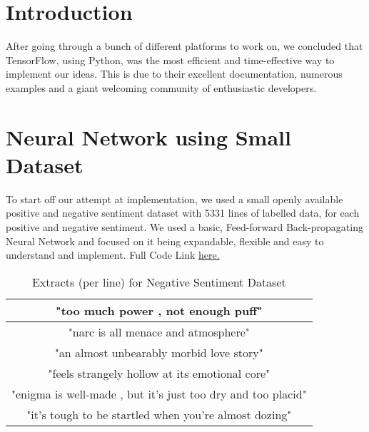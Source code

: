 
\section{Introduction}
After going through a bunch of different platforms to work on, we concluded that TensorFlow, using Python, was the most efficient and time-effective way to implement our ideas. This is due to their excellent documentation, numerous examples and a giant welcoming community of enthusiastic developers.


\section{Neural Network using Small Dataset}
To start off our attempt at implementation, we used a small openly available positive and negative sentiment dataset with 5331 lines of labelled data, for each positive and negative sentiment. We used a basic, Feed-forward Back-propagating Neural Network and focused on it being expandable, flexible and easy to understand and implement. Full Code Link \href{https://github.com/hsaygan/B.Tech-Project}{here.}

\begin{table}[htb]
\centering
\begin{tabular}{|c|}
\hline

"too much power , not enough puff"\\
\hline

"narc is all menace and atmosphere"\\
\hline

"an almost unbearably morbid love story"\\
\hline

"feels strangely hollow at its emotional core"\\
\hline

"enigma is well-made , but it's just too dry and too placid"\\
\hline

"it's tough to be startled when you're almost dozing"\\
\hline

\end{tabular}
\caption{Extracts (per line) for Negative Sentiment Dataset}
\label{tab:}
\end{table}


